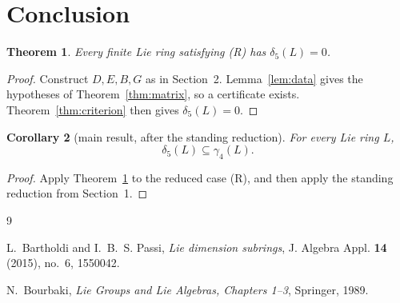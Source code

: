 \documentclass[11pt]{amsart}
\newtheorem{theorem}{Theorem}[section]
\newtheorem{corollary}[theorem]{Corollary}
\theoremstyle{definition}
\theoremstyle{remark}
\newcommand{\gam}{\gamma}
\newcommand{\del}{\delta}
\begin{document}
\section{Conclusion}

\begin{theorem}\label{thm:minimal}
Every finite Lie ring satisfying \textup{(R)} has
\(\del_5(L)=0\).
\end{theorem}

\begin{proof}
Construct \(D,E,B,G\) as in Section~2.  Lemma~\ref{lem:data} gives
the hypotheses of Theorem~\ref{thm:matrix}, so a certificate exists.
Theorem~\ref{thm:criterion} then gives \(\del_5(L)=0\).
\end{proof}

\begin{corollary}[main result, after the standing reduction]
For every Lie ring \(L\),
\[
                              \del_5(L)\subseteq\gam_4(L).
\]
\end{corollary}

\begin{proof}
Apply Theorem~\ref{thm:minimal} to the reduced case \textup{(R)}, and
then apply the standing reduction from Section~1.
\end{proof}

\begin{thebibliography}{9}

L.~Bartholdi and I.~B.~S. Passi,
\emph{Lie dimension subrings},
J. Algebra Appl. \textbf{14} (2015), no.~6, 1550042.

N.~Bourbaki,
\emph{Lie Groups and Lie Algebras, Chapters 1--3},
Springer, 1989.

\end{thebibliography}
\end{document}
